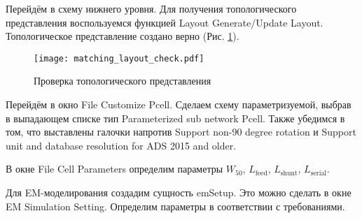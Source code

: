 Перейдём в схему нижнего уровня. Для получения топологического представления воспользуемся функцией Layout \textrightarrow Generate/Update Layout.
Топологическое представление создано верно (Рис. \ref{fig:matching_layout_check}).

\begin{figure}[!ht]
    \centering
    \texttt{[image: matching\_layout\_check.pdf]}
    \caption{Проверка топологического представления}
    \label{fig:matching_layout_check}
\end{figure}

Перейдём в окно File \textrightarrow Customize Pcell.
Сделаем схему параметризуемой, выбрав в выпадающем списке тип Parameterized sub network Pcell.
Также убедимся в том, что выставлены галочки напротив Support non-90 degree rotation и Support unit and database resolution for ADS 2015 and older.

В окне File \textrightarrow Cell Parameters определим параметры $W_{50}$, $L_\text{feed}$, $L_\text{shunt}$, $L_\text{serial}$.

Для EM-моделирования создадим сущность emSetup.
Это можно сделать в окне EM \textrightarrow Simulation Setting.
Определим параметры в соответствии с требованиями.
